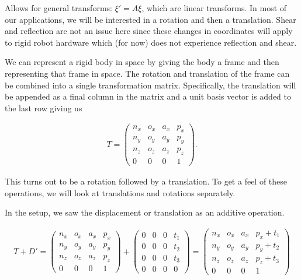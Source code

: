 Allows for general transforms: \(\xi' = A\xi\), which are linear
transforms. In most of our applications, we will be interested in a
rotation and then a translation. Shear and reflection are not an issue
here since these changes in coordinates will apply to rigid robot
hardware which (for now) does not experience reflection and shear.

We can represent a rigid body in space by giving the body a frame and
then representing that frame in space. The rotation and translation of
the frame can be combined into a single transformation matrix.
Specifically, the translation will be appended as a final column in the
matrix and a unit basis vector is added to the last row giving us

\[\begin{aligned}
T =  \begin{pmatrix}
         n_x & o_x & a_x & p_x \\
         n_y & o_y & a_y & p_y\\
         n_z & o_z & a_z & p_z \\
         0  &  0  &  0 & 1 \end{pmatrix}.
\end{aligned}\]

This turns out to be a rotation followed by a translation. To get a feel
of these operations, we will look at translations and rotations
separately.

In the setup, we saw the displacement or translation as an additive
operation.

\[\begin{aligned}
T + D' =
\begin{pmatrix}
         n_x & o_x & a_x & p_x \\
         n_y & o_y & a_y & p_y\\
         n_z & o_z & a_z & p_z \\
         0  &  0  &  0 & 1 \end{pmatrix}
 +
 \begin{pmatrix}0& 0 & 0 & t_1 \\
          0 & 0 & 0 & t_2\\ 0 &0 & 0 & t_3 \\
          0& 0& 0& 0 \end{pmatrix}
=
\begin{pmatrix}
         n_x & o_x & a_x & p_x + t_1\\
         n_y & o_y & a_y & p_y + t_2\\
         n_z & o_z & a_z & p_z + t_3\\
         0  &  0  &  0 & 1 \end{pmatrix}
\end{aligned}\]

